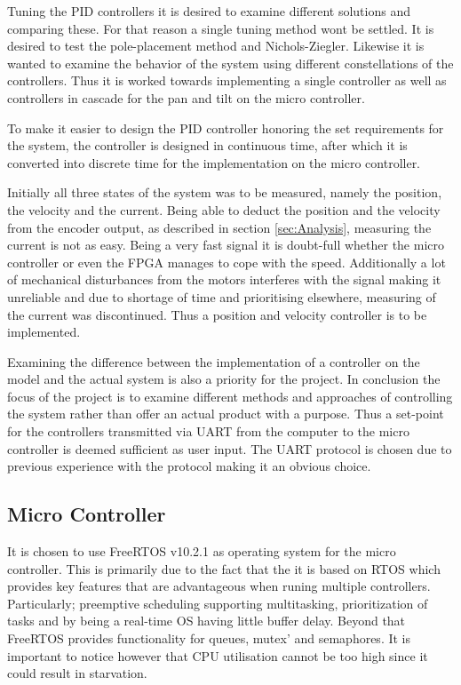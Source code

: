 \documentclass[../../main.tex]{subfiles}
\begin{document}
Tuning the PID controllers it is desired to examine different solutions and comparing these. For that reason a single tuning method wont be settled. It is desired to test the pole-placement method and Nichols-Ziegler. Likewise it is wanted to examine the behavior of the system using different constellations of the controllers. Thus it is worked towards implementing a single controller  as well as controllers in cascade for the pan and tilt on the micro controller.

To make it easier to design the PID controller honoring the set requirements for the system, the controller is designed in continuous time, after which it is converted into discrete time for the implementation on the micro controller. 

Initially all three states of the system was to be measured, namely the position, the velocity and the current. Being able to deduct the position and the velocity from the encoder output, as described in section \ref{sec:Analysis}, measuring the current is not as easy. Being a very fast signal it is doubt-full whether the micro controller or even the FPGA manages to cope with the speed. Additionally a lot of mechanical disturbances from the motors interferes with the signal making it unreliable and due to shortage of time and prioritising elsewhere, measuring of the current was discontinued. Thus a position and velocity controller is to be implemented.

Examining the difference between the implementation of a controller on the model and the actual system is also a priority for the project. In conclusion the focus of the project is to examine different methods and approaches of controlling the system rather than offer an actual product with a purpose. Thus a set-point for the controllers transmitted via UART from the computer to the micro controller is deemed sufficient as user input. The UART protocol is chosen due to previous experience with the protocol making it an obvious choice. 



\subsection*{Micro Controller}
It is chosen to use FreeRTOS v10.2.1 as operating system for the micro controller. This is primarily due to the fact that the it is based on RTOS which provides key features that are advantageous when runing multiple controllers. Particularly; preemptive scheduling supporting multitasking, prioritization of tasks and by being a real-time OS having little buffer delay. Beyond that FreeRTOS provides functionality for queues, mutex' and semaphores. It is important to notice however that CPU utilisation cannot be too high since it could result in starvation.
\end{document}
